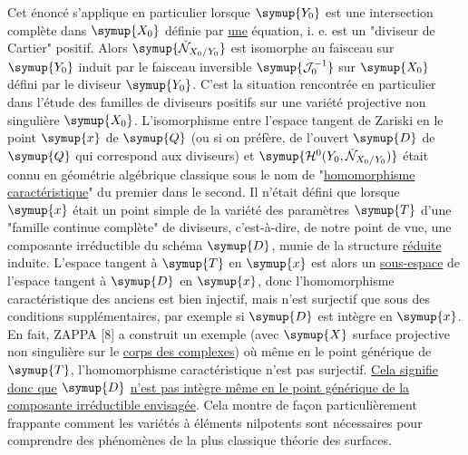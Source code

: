  Cet énoncé s'applique en particulier lorsque $\symup{Y_0}$ est
une intersection complète dans $\symup{X_0}$ définie par \uline{une} équation, i. e. est un
"diviseur de Cartier" positif. Alors $\symup{\check{\mathcal N}_{X_0/Y_0}}$ est isomorphe au
faisceau sur $\symup{Y_0}$ induit par le faisceau inversible $\symup{\mathcal J_0^{-1}}$ sur
$\symup{X_0}$ défini par le diviseur $\symup{Y_0}$. C'est la situation rencontrée en particulier
dans l'étude des familles de diviseurs positifs sur une variété projective non
singulière $\symup{X_0}$. L'isomorphisme entre l'espace tangent de Zariski en le point
$\symup{x}$ de $\symup{Q}$ (ou si on préfère, de l'ouvert $\symup{D}$ de $\symup{Q}$ qui correspond aux
diviseurs) et $\symup{\mathcal H^0(Y_0,\check{\mathcal N}_{X_0/Y_0})}$ était connu en géométrie
algébrique classique sous le nom de "\uline{homomorphisme caractéristique}" du premier
dans le second. Il n'était défini que lorsque $\symup{x}$ était un point simple de la
variété des paramètres $\symup{T}$ d'une "famille continue complète" de diviseurs,
c'est-à-dire, de notre point de vue, une composante irréductible du schéma
$\symup{D}$, munie de la structure \uline{réduite} induite. L'espace tangent à $\symup{T}$ en $\symup{x}$ est alors
un \uline{sous-espace} de l'espace tangent à $\symup{D}$ en $\symup{x}$, donc l'homomorphisme
caractéristique des anciens est bien injectif, mais n'est surjectif que sous des
conditions supplémentaires, par exemple si $\symup{D}$ est intègre en $\symup{x}$. En fait,
ZAPPA [8] a construit un exemple
(avec $\symup{X}$ surface projective non singulière sur le \uline{corps des complexes}) où même
en le point générique de $\symup{T}$, l'homomorphisme caractéristique n'est pas
surjectif. \uline{Cela signifie donc que} $\symup{D}$ \uline{n'est pas intègre même en le point
générique de la composante irréductible envisagée}. Cela montre de façon
particulièrement frappante comment les variétés à éléments nilpotents sont
nécessaires pour comprendre des phénomènes de la plus classique théorie des
surfaces.

